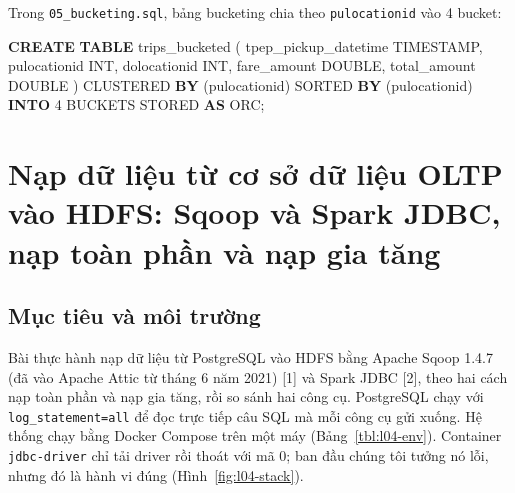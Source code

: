 \documentclass[
  12pt,
  a4paper,
]{report}
\newenvironment{Shaded}{}{}
\newcommand{\DataTypeTok}[1]{\textcolor[rgb]{0.56,0.13,0.00}{#1}}
\newcommand{\DecValTok}[1]{\textcolor[rgb]{0.25,0.63,0.44}{#1}}
\newcommand{\KeywordTok}[1]{\textcolor[rgb]{0.00,0.44,0.13}{\textbf{#1}}}
\newcommand{\NormalTok}[1]{#1}
\begin{document}
Trong
\texttt{05\_}\allowbreak{}\texttt{bucketing.}\allowbreak{}\texttt{sql}\allowbreak{},
bảng bucketing chia theo \texttt{pulocationid} vào 4 bucket:

\begin{Shaded}
\begin{Highlighting}[]
\KeywordTok{CREATE} \KeywordTok{TABLE}\NormalTok{ trips\_bucketed (}
\NormalTok{  tpep\_pickup\_datetime }\DataTypeTok{TIMESTAMP}\NormalTok{, pulocationid }\DataTypeTok{INT}\NormalTok{, dolocationid }\DataTypeTok{INT}\NormalTok{,}
\NormalTok{  fare\_amount }\DataTypeTok{DOUBLE}\NormalTok{, total\_amount }\DataTypeTok{DOUBLE}
\NormalTok{)}
\NormalTok{CLUSTERED }\KeywordTok{BY}\NormalTok{ (pulocationid) SORTED }\KeywordTok{BY}\NormalTok{ (pulocationid) }\KeywordTok{INTO} \DecValTok{4}\NormalTok{ BUCKETS}
\NormalTok{STORED }\KeywordTok{AS}\NormalTok{ ORC;}
\end{Highlighting}
\end{Shaded}

\chapter{Nạp dữ liệu từ cơ sở dữ liệu OLTP vào HDFS: Sqoop và Spark
JDBC, nạp toàn phần và nạp gia tăng}\label{sec:l04}

\section{Mục tiêu và môi trường}\label{sec:l04-intro}

Bài thực hành nạp dữ liệu từ PostgreSQL vào HDFS bằng Apache Sqoop 1.4.7
(đã vào Apache Attic từ tháng 6 năm 2021) {[}1{]} và Spark JDBC {[}2{]},
theo hai cách nạp toàn phần và nạp gia tăng, rồi so sánh hai công cụ.
PostgreSQL chạy với
\texttt{log\_}\allowbreak{}\texttt{statement=}\allowbreak{}\texttt{all}\allowbreak{}
để đọc trực tiếp câu SQL mà mỗi công cụ gửi xuống. Hệ thống chạy bằng
Docker Compose trên một máy (Bảng~\ref{tbl:l04-env}). Container
\texttt{jdbc-driver} chỉ tải driver rồi thoát với mã 0; ban đầu chúng
tôi tưởng nó lỗi, nhưng đó là hành vi đúng (Hình~\ref{fig:l04-stack}).
\end{document}
